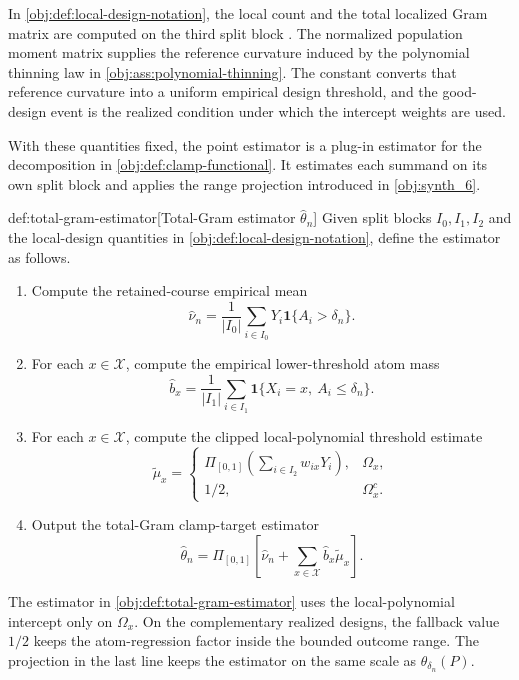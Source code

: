 In \cref{obj:def:local-design-notation}, the local count  and the total localized Gram matrix  are computed on the third split block . The normalized population moment matrix  supplies the reference curvature induced by the polynomial thinning law in \cref{obj:ass:polynomial-thinning}. The constant  converts that reference curvature into a uniform empirical design threshold, and the good-design event  is the realized condition under which the intercept weights  are used.

With these quantities fixed, the point estimator is a plug-in estimator for the decomposition in \cref{obj:def:clamp-functional}. It estimates each summand on its own split block and applies the range projection introduced in \cref{obj:synth_6}.

\begin{algorithmv}{def:total-gram-estimator}[Total-Gram estimator \(\widehat\theta_n\)]
Given split blocks \(I_0,I_1,I_2\) and the local-design quantities in \cref{obj:def:local-design-notation}, define the estimator as follows.
\begin{enumerate}
\item Compute the retained-course empirical mean
\[
\widehat\nu_n
=
\frac{1}{|I_0|}
\sum_{i\in I_0}Y_i\mathbf 1\{A_i>\delta_n\}.
\]
\item For each \(x\in\mathcal X\), compute the empirical lower-threshold atom mass
\[
\widehat b_x
=
\frac{1}{|I_1|}
\sum_{i\in I_1}\mathbf 1\{X_i=x,\ A_i\leq\delta_n\}.
\]
\item For each \(x\in\mathcal X\), compute the clipped local-polynomial threshold estimate
\[
\widetilde\mu_x
=
\begin{cases}
\Pi_{[0,1]}\!\left(\sum_{i\in I_2}w_{ix}Y_i\right),& \Omega_x,\\
1/2,& \Omega_x^{c}.
\end{cases}
\]
\item Output the total-Gram clamp-target estimator
\[
\widehat\theta_n
=
\Pi_{[0,1]}\!\left[
\widehat\nu_n+\sum_{x\in\mathcal X}\widehat b_x\widetilde\mu_x
\right].
\]
\end{enumerate}
\end{algorithmv}

The estimator  in \cref{obj:def:total-gram-estimator} uses the local-polynomial intercept only on \(\Omega_x\). On the complementary realized designs, the fallback value \(1/2\) keeps the atom-regression factor inside the bounded outcome range. The projection in the last line keeps the estimator on the same scale as \(\theta_{\delta_n}(P)\).


